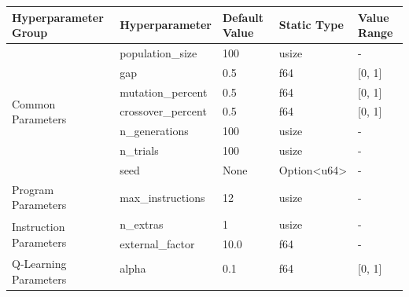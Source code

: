 \documentclass[12pt, final]{dalcsthesis}
\begin{document}
\begin{table}[hb]
	\centering
	\begin{tabular}{|p{3.5cm}|p{3cm}|p{2.5cm}|p{1.5cm}|p{1.5cm}|}
		\hline
		\textbf{Hyperparameter Group}           & \textbf{Hyperparameter} & \textbf{Default Value} & \textbf{Static Type}            & \textbf{Value Range} \\ \hline
		\multirow{7}{*}{Common Parameters}      & population\_size        & 100                    & usize                           & -                    \\ \cline{2-5}
		                                        & gap                     & 0.5                    & f64                             & [0, 1]               \\ \cline{2-5}
		                                        & mutation\_percent       & 0.5                    & f64                             & [0, 1]               \\ \cline{2-5}
		                                        & crossover\_percent      & 0.5                    & f64                             & [0, 1]               \\ \cline{2-5}
		                                        & n\_generations          & 100                    & usize                           & -                    \\ \cline{2-5}
		                                        & n\_trials               & 100                    & usize                           & -                    \\ \cline{2-5}
		                                        & seed                    & None                   & Option\textless u64\textgreater & -                    \\ \hline
		Program Parameters                      & max\_instructions       & 12                     & usize                           & -                    \\ \hline
		\multirow{2}{*}{Instruction Parameters} & n\_extras               & 1                      & usize                           & -                    \\ \cline{2-5}
		                                        & external\_factor        & 10.0                   & f64                             & -                    \\ \hline
		\multirow{5}{*}{Q-Learning Parameters}  & alpha                   & 0.1                    & f64                             & [0, 1]               \\ \cline{2-5}

\end{tabular}
\end{table}
\end{document}

